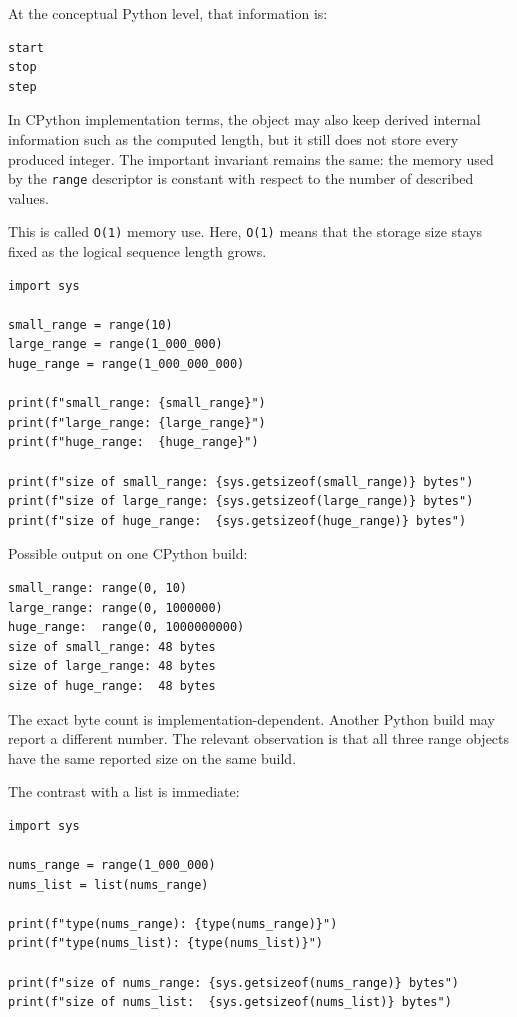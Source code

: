 \documentclass[a4paper,twoside]{report}
\begin{document}
At the conceptual Python level, that information is:

\begin{verbatim}
start
stop
step
\end{verbatim}

In CPython implementation terms, the object may also keep derived internal information such as the computed length, but it still does not store every produced integer. The important invariant remains the same: the memory used by the \texttt{range} descriptor is constant with respect to the number of described values.

This is called \texttt{O(1)} memory use. Here, \texttt{O(1)} means that the storage size stays fixed as the logical sequence length grows.

\begin{verbatim}
import sys

small_range = range(10)
large_range = range(1_000_000)
huge_range = range(1_000_000_000)

print(f"small_range: {small_range}")
print(f"large_range: {large_range}")
print(f"huge_range:  {huge_range}")

print(f"size of small_range: {sys.getsizeof(small_range)} bytes")
print(f"size of large_range: {sys.getsizeof(large_range)} bytes")
print(f"size of huge_range:  {sys.getsizeof(huge_range)} bytes")
\end{verbatim}

Possible output on one CPython build:

\begin{verbatim}
small_range: range(0, 10)
large_range: range(0, 1000000)
huge_range:  range(0, 1000000000)
size of small_range: 48 bytes
size of large_range: 48 bytes
size of huge_range:  48 bytes
\end{verbatim}

The exact byte count is implementation-dependent. Another Python build may report a different number. The relevant observation is that all three range objects have the same reported size on the same build.

The contrast with a list is immediate:

\begin{verbatim}
import sys

nums_range = range(1_000_000)
nums_list = list(nums_range)

print(f"type(nums_range): {type(nums_range)}")
print(f"type(nums_list): {type(nums_list)}")

print(f"size of nums_range: {sys.getsizeof(nums_range)} bytes")
print(f"size of nums_list:  {sys.getsizeof(nums_list)} bytes")
\end{verbatim}
\end{document}
